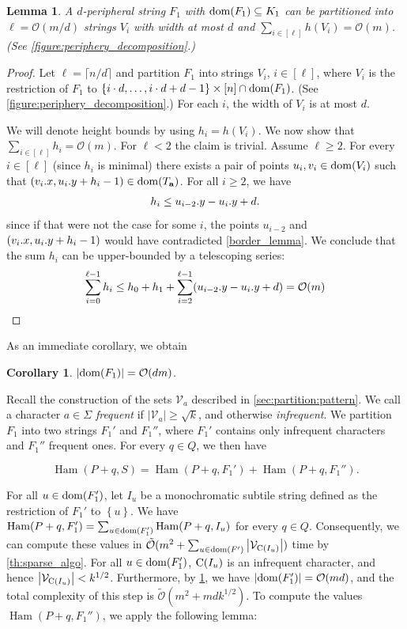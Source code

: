 \documentclass[a4paper,11pt]{article}
\let\Cref\cref
\newtheorem{corollary}{Corollary}[section]
\newtheorem{lemma}{Lemma}[section]
\renewcommand{\O}{\mathcal{O}}
\newcommand{\tO}{\tilde{\mathcal{O}}}
\newcommand{\V}{\mathcal{V}}
\newcommand{\Ta}{T_\mathbf{a}}
\newcommand{\set}[1]{\left\lbrace #1 \right\rbrace}
\DeclareMathOperator*{\Ham}{Ham}
\newcommand{\absolute}[1]{\left\lvert#1\right\rvert}
\begin{document}
\begin{lemma}\label{lm:partitioning}
A $d$-peripheral string $F_1$ with $\operatorname*{dom}(F_1) \subseteq K_1$ can be partitioned into $\ell = \O(m/d)$ strings $V_i$ with width at most $d$ and $\sum_{i \in [\ell]} h(V_i) = \O(m)$. (See \cref{figure:periphery_decomposition}.)
\end{lemma}
\begin{proof}
Let $\ell = \lceil n / d \rceil$ and partition $F_1$ into strings $V_i$, $i \in [\ell]$, where $V_i$ is the restriction of $F_1$ to $\set{i \cdot d, \dots, i \cdot d + d - 1} \times [n] \cap \d{F_1}$. (See \cref{figure:periphery_decomposition}.) 
For each $i$, the width of $V_i$ is at most $d$. 

We will denote height bounds by using $h_i = h(V_i)$. We now show that $\sum_{i \in [\ell]} h_i = \O(m)$. For $\ell < 2$ the claim is trivial. Assume $\ell \ge 2$. For every $i \in [\ell]$ (since $h_i$ is minimal) there exists a pair of points $u_i, v_i \in \operatorname*{dom}(V_i)$ such that $(\x{v_i}, \y{u_i} + h_i - 1) \in \d{\Ta}$. For all $i \ge 2$, we have
\[ h_i \le u_{i - 2}.y - u_{i}.y + d.\]
since if that were not the case for some $i$, the points $u_{i - 2}$ and $(v_{i}.x, u_{i}.y + h_i - 1)$ would have contradicted \cref{border_lemma}. We conclude that the sum $h_i$ can be upper-bounded by a telescoping series:
%
$$\sum_{i = 0}^{\ell - 1} h_i \le h_0 + h_1 + \sum_{i = 2}^{\ell - 1} (\y{u_{i - 2}} - \y{u_i} + d) = \O(m)$$
\end{proof}

As an immediate corollary, we obtain

\begin{corollary}\label{cor:area_F}
$\absolute{\d{F_1}} = \O(dm)$. 
\end{corollary}

Recall the construction of the sets $\V_a$ described in \Cref{sec:partition:pattern}. We call a character $a \in \Sigma$ \emph{frequent} if $\absolute{\V_a} \ge \sqrt{k}$, and otherwise \emph{infrequent}. We partition $F_1$ into two strings $F_1'$ and $F_1''$, where $F_1'$ contains only infrequent characters and $F_1''$ frequent ones. For every $q \in Q$, we then have 

\[\Ham(P + q, S) = \Ham(P + q, F_1') + \Ham(P + q, F_1'').\]

For all $u \in \operatorname*{dom}(F_1')$, let $I_u$ be a monochromatic subtile string defined as the restriction of $F_1'$ to $\set{u}$. 
We have $\Ham(P + q, F_1') = \sum_{u \in \d{F_1'}} \Ham(P + q, I_u)$ for every $q \in Q$. 
Consequently, we can compute these values in $\tO(m^2 + \sum_{u \in \d{F'}} \absolute{\V_{\getchar{I_u}}})$ time by \cref{th:sparse_algo}. 
For all $u \in \operatorname*{dom}(F_1')$, $\operatorname*{C}(I_u)$ is an infrequent character, and hence $\absolute{\V_{\getchar{I_u}}} < k^{1/2}$. 
Furthermore, by \cref{cor:area_F}, we have $\absolute{\d{F_1'}} = \O(md)$, and the total complexity of this step is $\tO(m^2 + mdk^{1/2})$. 
To compute the values $\Ham(P + q, F_1'')$, we apply the following lemma:
\end{document}
